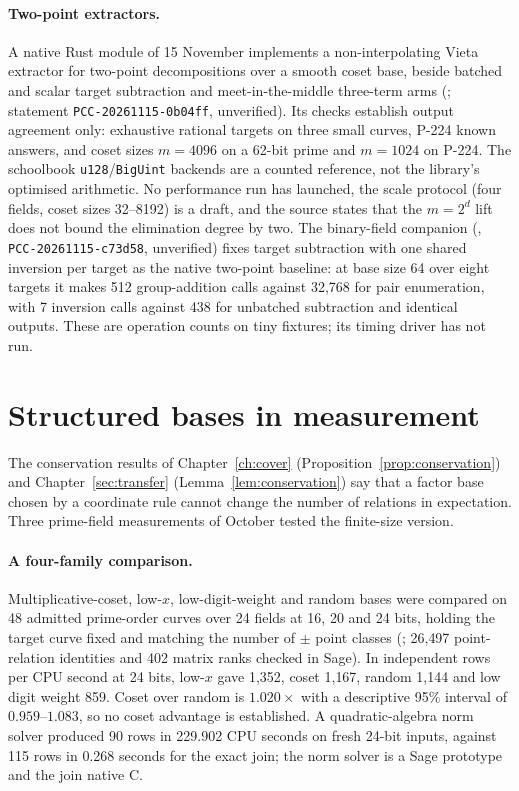 \paragraph{Two-point extractors.} A native Rust module of 15 November
implements a non-interpolating Vieta extractor for two-point decompositions
over a smooth coset base, beside batched and scalar target subtraction and
meet-in-the-middle three-term arms
(; statement
\texttt{PCC-20261115-0b04ff}, unverified). Its checks establish output
agreement only: exhaustive rational targets on three small curves, P-224
known answers, and coset sizes $m=4096$ on a 62-bit prime and $m=1024$ on
P-224. The schoolbook \texttt{u128}/\texttt{BigUint} backends are a counted
reference, not the library's optimised arithmetic. No performance run has
launched, the scale protocol (four fields, coset sizes 32--8192) is a draft,
and the source states that the $m=2^d$ lift does not bound the elimination
degree by two. The binary-field companion
(,
\texttt{PCC-20261115-c73d58}, unverified) fixes target subtraction with one
shared inversion per target as the native two-point baseline: at base size
64 over eight targets it makes 512 group-addition calls against 32{,}768 for
pair enumeration, with 7 inversion calls against 438 for unbatched
subtraction and identical outputs. These are operation counts on tiny
fixtures; its timing driver has not run.

\section{Structured bases in measurement}\label{sec:pg-structured}

The conservation results of Chapter~\ref{ch:cover}
(Proposition~\ref{prop:conservation}) and Chapter~\ref{sec:transfer}
(Lemma~\ref{lem:conservation}) say that a factor base chosen by a
coordinate rule cannot change the number of relations in expectation.
Three prime-field measurements of October tested the finite-size version.

\paragraph{A four-family comparison.} Multiplicative-coset, low-$x$,
low-digit-weight and random bases were compared on 48 admitted prime-order
curves over 24 fields at 16, 20 and 24 bits, holding the target curve fixed
and matching the number of $\pm$ point classes
(; 26{,}497 point-relation
identities and 402 matrix ranks checked in Sage). In independent rows per
CPU second at 24 bits, low-$x$ gave 1{,}352, coset 1{,}167, random 1{,}144 and
low digit weight 859. Coset over random is $1.020\times$ with a descriptive
95\% interval of $0.959$--$1.083$, so no coset advantage is established. A
quadratic-algebra norm solver produced 90 rows in 229.902 CPU seconds on
fresh 24-bit inputs, against 115 rows in 0.268 seconds for the exact join;
the norm solver is a Sage prototype and the join native C.

